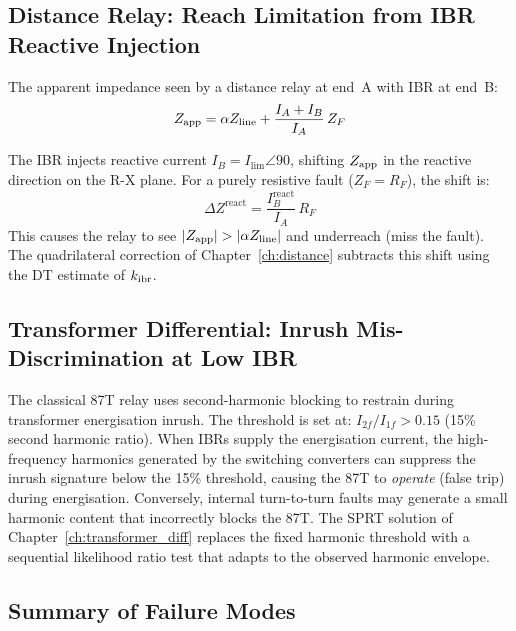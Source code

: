 \subsection{Distance Relay: Reach Limitation from IBR Reactive Injection}

The apparent impedance seen by a distance relay at end~A with IBR at end~B:
\begin{equation}
  Z_\mathrm{app} = \alpha Z_\mathrm{line} + \frac{I_A + I_B}{I_A}\, Z_F
  \label{eq:ch3_zapp}
\end{equation}

The IBR injects reactive current $I_B = I_\mathrm{lim}\angle 90$,
shifting $Z_\mathrm{app}$ in the reactive direction on the R-X plane. For a
purely resistive fault ($Z_F = R_F$), the shift is:
\begin{equation}
  \Delta Z^\mathrm{react} = \frac{I_B^\mathrm{react}}{I_A}\, R_F
  \label{eq:ch3_reach_shift}
\end{equation}
This causes the relay to see $|Z_\mathrm{app}| > |\alpha Z_\mathrm{line}|$ and underreach
(miss the fault). The quadrilateral correction of
Chapter~\ref{ch:distance} subtracts this shift using the DT estimate of $k_\mathrm{ibr}$.

\subsection{Transformer Differential: Inrush Mis-Discrimination at Low IBR}

The classical 87T relay uses second-harmonic blocking to restrain during
transformer energisation inrush. The threshold is set at:
$I_{2f}/I_{1f} > 0.15$ (15\% second harmonic ratio).
When IBRs supply the energisation current, the high-frequency harmonics
generated by the switching converters can suppress the inrush signature
below the 15\% threshold, causing the 87T to \emph{operate} (false trip)
during energisation. Conversely, internal turn-to-turn faults may generate
a small harmonic content that incorrectly blocks the 87T.
The SPRT solution of Chapter~\ref{ch:transformer_diff} replaces the fixed
harmonic threshold with a sequential likelihood ratio test that adapts to
the observed harmonic envelope.

\subsection{Summary of Failure Modes}

